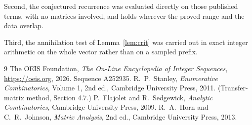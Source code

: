 \documentclass[11pt,a4paper]{article}
\theoremstyle{plain}
\theoremstyle{definition}
\begin{document}
Second, the conjectured recurrence was evaluated directly on those published terms, with no
matrices involved, and holds wherever the proved range and the data overlap.

Third, the annihilation test of Lemma~\ref{lem:crit} was carried out in exact integer
arithmetic on the whole vector rather than on a sampled prefix.

\begin{thebibliography}{9}
 The OEIS Foundation, \emph{The On-Line Encyclopedia of Integer
Sequences}, \url{https://oeis.org}, 2026. Sequence A252935.
 R.~P.~Stanley, \emph{Enumerative Combinatorics}, Volume 1, 2nd ed.,
Cambridge University Press, 2011. (Transfer-matrix method, Section 4.7.)
 P.~Flajolet and R.~Sedgewick, \emph{Analytic Combinatorics}, Cambridge
University Press, 2009.
 R.~A.~Horn and C.~R.~Johnson, \emph{Matrix Analysis}, 2nd ed., Cambridge
University Press, 2013.
\end{thebibliography}
\end{document}
